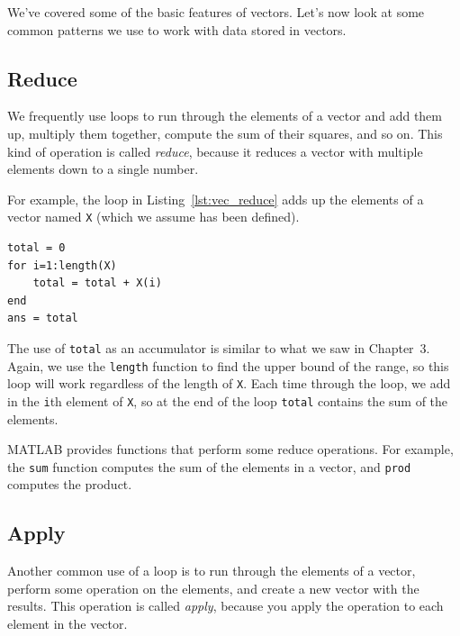 We've covered some of the basic features of vectors. Let's now look at some common patterns we use to work with data stored in vectors.

\subsection{Reduce}
\label{reduce}

We frequently use loops to run through the elements of a vector
and add them up, multiply them together, compute the sum
of their squares, and so on.  This kind of operation is called \emph{reduce},
because it reduces a vector with multiple elements down to a single
number.


For example, the loop in Listing~\ref{lst:vec_reduce} adds up the elements of a vector named \lstinline{X} (which we assume has been defined).

\begin{lstlisting}[caption={Reducing a vector to a single scalar value (the sum)}, label={lst:vec_reduce}]
total = 0
for i=1:length(X)
    total = total + X(i)
end
ans = total
\end{lstlisting}

The use of \lstinline{total} as an accumulator is similar to what we
saw in Chapter~3.  Again, we use the \lstinline{length} function
to find the upper bound of the range, so this loop will work
regardless of the length of \lstinline{X}.
Each time through the loop, we add
in the \lstinline{i}th element of \lstinline{X}, so at the end of the loop
\lstinline{total} contains the sum of the elements.


MATLAB provides functions that perform some reduce operations.
For example, the \lstinline{sum} function computes the sum of the elements
in a vector, and \lstinline{prod} computes the product.


\subsection{Apply}
\label{apply}

Another common use of a loop is to run through the elements of
a vector, perform some operation on the elements, and create
a new vector with the results.  This operation is called
\emph{apply}, because you apply the operation to each element in
the vector.


